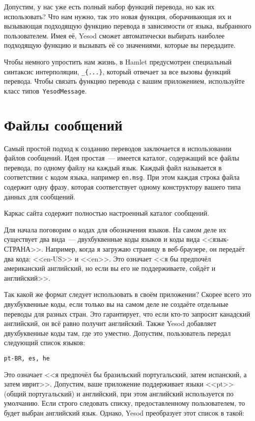 Допустим, у нас уже есть полный набор функций перевода, но как их использовать?
Что нам нужно, так это новая функция, оборачивающая их и вызывающая подходящую
функцию перевода в зависимости от языка, выбранного пользователем. Имея её,
Yesod сможет автоматически выбирать наиболее подходящую функцию и вызывать её
со значениями, которые вы передадите.

Чтобы немного упростить нам жизнь, в Hamlet предусмотрен специальный синтаксис
интерполяции, \lstinline'_{...}', который отвечает за все вызовы функций
перевода. Чтобы связать функцию перевода с вашим приложением, используйте класс
типов~\lstinline'YesodMessage'.

\section{Файлы сообщений}

Самый простой подход к созданию переводов заключается в использовании файлов
сообщений. Идея простая~--- имеется каталог, содержащий все файлы перевода, по
одному файлу на каждый язык. Каждый файл называется в соответствии с кодом
языка, например \texttt{en.msg}. При этом каждая строка файла содержит одну
фразу, которая соответствует одному конструктору вашего типа данных для
сообщений.

\begin{remark}
    Каркас сайта содержит полностью настроенный каталог сообщений.
\end{remark}

Для начала поговорим о кодах для обозначения языков. На самом деле их
существует два вида~--- двухбуквенные коды языков и коды вида <<язык-СТРАНА>>.
Например, когда я загружаю страницу в веб-браузере, он передаёт два кода:
<<en-US>> и <<en>>. Это означает <<я бы предпочёл американский английский, но
если вы его не поддерживаете, сойдёт и английский>>.

Так какой же формат следует использовать в своём приложении? Скорее всего это
двухбуквенные коды, если только вы на самом деле не создаёте отдельные переводы
для разных стран. Это гарантирует, что если кто-то запросит канадский
английский, он всё равно получит английский. Также Yesod добавляет
двухбуквенные коды там, где это уместно. Допустим, пользователь передал
следующий список языков:

\begin{lstlisting}
pt-BR, es, he
\end{lstlisting}

Это означает <<я предпочёл бы бразильский португальский, затем испанский, а
затем иврит>>. Допустим, ваше приложение поддерживает языки <<pt>> (общий
португальский) и английский, при этом английский используется по умолчанию.
Если строго следовать списку, предоставленному пользователем, то будет выбран
английский язык. Однако, Yesod преобразует этот список в такой:

